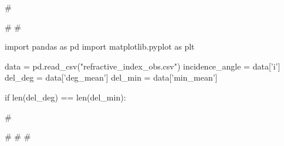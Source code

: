 #\documentclass{article}
\begin{document}
#
#\begin{pycode}
import pandas as pd
import matplotlib.pyplot as plt

data = pd.read_csv("refractive_index_obs.csv")
incidence_angle = data['i']
del_deg = data['deg_mean']
del_min = data['min_mean']

if len(del_deg) == len(del_min):
 	
#\end{pycode}
#
#
#
\end{document}
